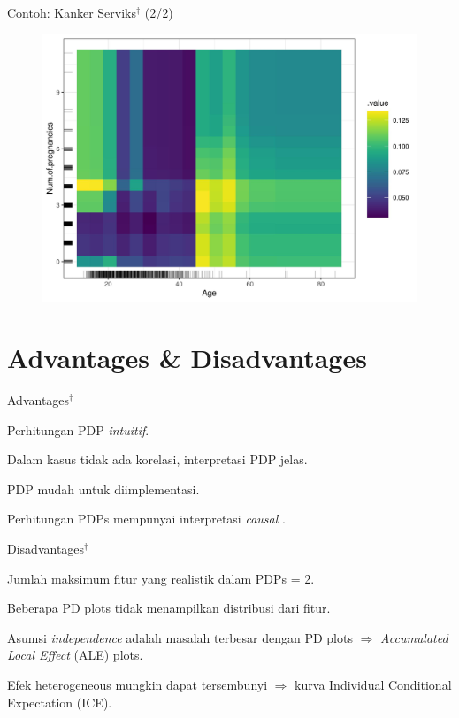\documentclass[aspectratio=169]{beamer}
\begin{document}
\begin{frame}{Contoh: Kanker Serviks$^\dagger$ (2/2)}
	\begin{figure}[!ht]
		\centering
		\includegraphics[scale=.5]{images/pdp-cervical-2.jpeg}
	\end{figure}
\end{frame}

\section{Advantages \& Disadvantages}
\begin{frame}{Advantages$^\dagger$}
	\begin{vfilleditems}
		\item Perhitungan PDP \textit{intuitif}.
		\item Dalam kasus tidak ada korelasi, interpretasi PDP jelas.
		\item PDP mudah untuk diimplementasi.
		\item Perhitungan PDPs mempunyai interpretasi \textit{causal} \citep{zhao2021causal}. 
	\end{vfilleditems}
\end{frame}

\begin{frame}{Disadvantages$^\dagger$}
	\begin{vfilleditems}
	\item Jumlah maksimum fitur yang realistik dalam PDPs = 2.
	\item Beberapa PD plots tidak menampilkan distribusi dari fitur. 
	\item Asumsi \textit{independence} adalah masalah terbesar dengan PD plots $\Rightarrow$ \textit{Accumulated Local Effect} (ALE) plots.
	\item Efek heterogeneous mungkin dapat tersembunyi $\Rightarrow$  kurva Individual Conditional Expectation (ICE).
\end{vfilleditems}	
\end{frame}
\end{document}

